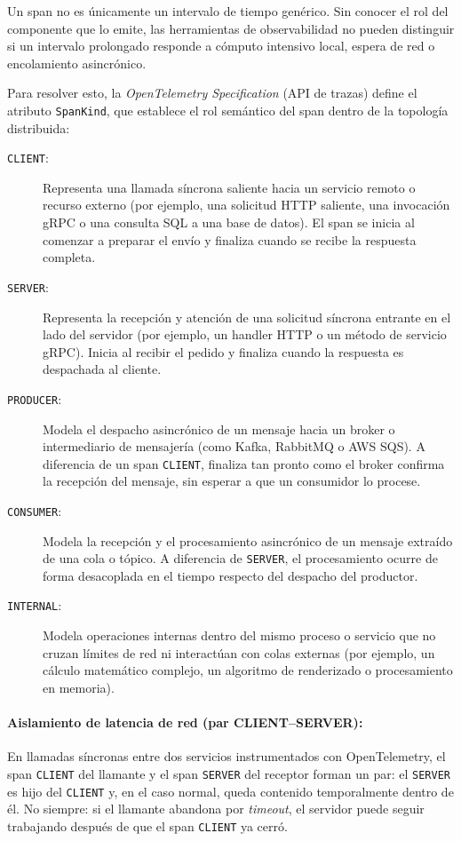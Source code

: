 \documentclass[variant=apuntes,cover=institutional,mode=screen]{ua-engineering-v6-article}
\begin{document}
Un span no es únicamente un intervalo de tiempo genérico. Sin conocer el rol del componente que lo emite, las herramientas de observabilidad no pueden distinguir si un intervalo prolongado responde a cómputo intensivo local, espera de red o encolamiento asincrónico.

Para resolver esto, la \emph{OpenTelemetry Specification} (API de trazas) define el atributo \texttt{SpanKind}, que establece el rol semántico del span dentro de la topología distribuida:

\begin{description}
\item[\texttt{CLIENT}:] Representa una llamada síncrona saliente hacia un servicio remoto o recurso externo (por ejemplo, una solicitud HTTP saliente, una invocación gRPC o una consulta SQL a una base de datos). El span se inicia al comenzar a preparar el envío y finaliza cuando se recibe la respuesta completa.
\item[\texttt{SERVER}:] Representa la recepción y atención de una solicitud síncrona entrante en el lado del servidor (por ejemplo, un handler HTTP o un método de servicio gRPC). Inicia al recibir el pedido y finaliza cuando la respuesta es despachada al cliente.
\item[\texttt{PRODUCER}:] Modela el despacho asincrónico de un mensaje hacia un broker o intermediario de mensajería (como Kafka, RabbitMQ o AWS SQS). A diferencia de un span \texttt{CLIENT}, finaliza tan pronto como el broker confirma la recepción del mensaje, sin esperar a que un consumidor lo procese.
\item[\texttt{CONSUMER}:] Modela la recepción y el procesamiento asincrónico de un mensaje extraído de una cola o tópico. A diferencia de \texttt{SERVER}, el procesamiento ocurre de forma desacoplada en el tiempo respecto del despacho del productor.
\item[\texttt{INTERNAL}:] Modela operaciones internas dentro del mismo proceso o servicio que no cruzan límites de red ni interactúan con colas externas (por ejemplo, un cálculo matemático complejo, un algoritmo de renderizado o procesamiento en memoria).
\end{description}

\paragraph{Aislamiento de latencia de red (par CLIENT--SERVER):}
En llamadas síncronas entre dos servicios instrumentados con OpenTelemetry, el span \texttt{CLIENT} del llamante y el span \texttt{SERVER} del receptor forman un par: el \texttt{SERVER} es hijo del \texttt{CLIENT} y, en el caso normal, queda contenido temporalmente dentro de él. No siempre: si el llamante abandona por \emph{timeout}, el servidor puede seguir trabajando después de que el span \texttt{CLIENT} ya cerró.
\end{document}
